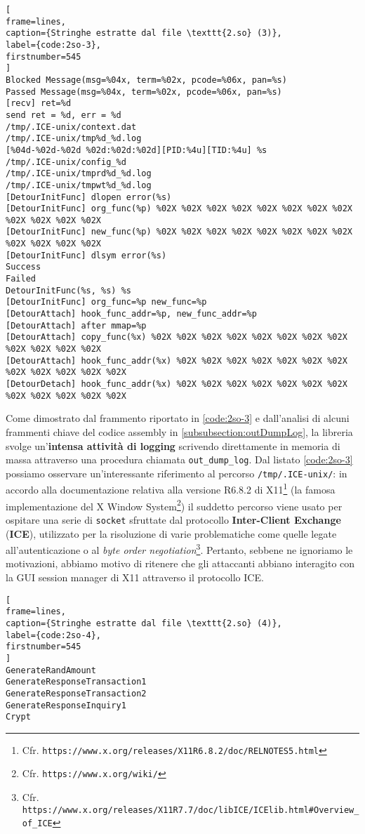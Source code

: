 \documentclass[10pt,a4paper, titlepage]{report}
\begin{document}
\begin{lstlisting}[
frame=lines, 
caption={Stringhe estratte dal file \texttt{2.so} (3)}, 
label={code:2so-3},
firstnumber=545
]
Blocked Message(msg=%04x, term=%02x, pcode=%06x, pan=%s)
Passed Message(msg=%04x, term=%02x, pcode=%06x, pan=%s)
[recv] ret=%d
send ret = %d, err = %d
/tmp/.ICE-unix/context.dat
/tmp/.ICE-unix/tmp%d_%d.log
[%04d-%02d-%02d %02d:%02d:%02d][PID:%4u][TID:%4u] %s
/tmp/.ICE-unix/config_%d
/tmp/.ICE-unix/tmprd%d_%d.log
/tmp/.ICE-unix/tmpwt%d_%d.log
[DetourInitFunc] dlopen error(%s)
[DetourInitFunc] org_func(%p) %02X %02X %02X %02X %02X %02X %02X %02X %02X %02X %02X %02X
[DetourInitFunc] new_func(%p) %02X %02X %02X %02X %02X %02X %02X %02X %02X %02X %02X %02X
[DetourInitFunc] dlsym error(%s)
Success
Failed
DetourInitFunc(%s, %s) %s
[DetourInitFunc] org_func=%p new_func=%p
[DetourAttach] hook_func_addr=%p, new_func_addr=%p
[DetourAttach] after mmap=%p
[DetourAttach] copy_func(%x) %02X %02X %02X %02X %02X %02X %02X %02X %02X %02X %02X %02X
[DetourAttach] hook_func_addr(%x) %02X %02X %02X %02X %02X %02X %02X %02X %02X %02X %02X %02X
[DetourDetach] hook_func_addr(%x) %02X %02X %02X %02X %02X %02X %02X %02X %02X %02X %02X %02X
\end{lstlisting}

Come dimostrato dal frammento riportato in \ref{code:2so-3} e dall'analisi di alcuni frammenti chiave del codice assembly in \ref{subsubsection:outDumpLog}, la libreria svolge un'\textbf{intensa attività di logging} scrivendo direttamente in memoria di massa attraverso una procedura chiamata \texttt{out\_dump\_log}.
Dal listato \ref{code:2so-3} possiamo osservare un'interessante riferimento al percorso \texttt{/tmp/.ICE-unix/}: in accordo alla documentazione relativa alla versione R6.8.2 di X11\footnote{Cfr. \texttt{https://www.x.org/releases/X11R6.8.2/doc/RELNOTES5.html}} (la famosa implementazione del X Window System\footnote{Cfr. \texttt{https://www.x.org/wiki/}})
il suddetto percorso viene usato per ospitare una serie di \texttt{socket} sfruttate dal protocollo \textbf{Inter-Client Exchange} (\textbf{ICE}), utilizzato per la risoluzione di varie problematiche come quelle legate all'autenticazione o al \textit{byte order negotiation}\footnote{Cfr. \texttt{https://www.x.org/releases/X11R7.7/doc/libICE/ICElib.html\#Overview\_of\_ICE}}. Pertanto, sebbene ne ignoriamo le motivazioni, abbiamo motivo di ritenere che gli attaccanti abbiano interagito con la GUI session manager di X11 attraverso il protocollo ICE.

\begin{lstlisting}[
frame=lines, 
caption={Stringhe estratte dal file \texttt{2.so} (4)}, 
label={code:2so-4},
firstnumber=545
]
GenerateRandAmount
GenerateResponseTransaction1
GenerateResponseTransaction2
GenerateResponseInquiry1
Crypt
\end{lstlisting}
\end{document}
